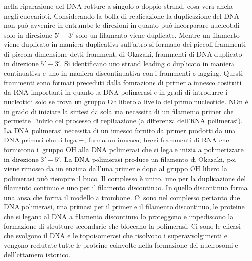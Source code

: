 nella riparazione del DNA rotture a singolo o doppio strand, cosa vera anche negli euocarioti. Considerando la bolla di replicazione la duplicazione del DNA non pu\`o avvenire in entrambe
le direzioni in quanto pu\`o incorporare nucleotidi solo in direzione $5'-3'$ solo un filamento viene duplicato. Mentre un filamento viene duplicato in maniera duplicativa sull'altro 
si formano dei piccoli frammenti di piccola dimensione detti frammenti di Okazaki, frammenti di DNA duplicato in direzione $5'-3'$. Si identificano uno strand leading o duplicato in 
maniera continuativa e uno in maniera discontinuativa con i frammenti o lagging. Questi frammenti sono formati preceduti dalla fomrazione di primer a innesco cosituiti da RNA importanti
in quanto la DNA polimerasi \`e in gradi di introdurre i nucleotidi solo se trova un gruppo Oh libero a livello del primo nucleotide. NOn \`e in grado di iniziare la sintesi da sola 
ma necessita di un filamento primer che permette l'inizio del processo di replicazione (a differenza dell'RNA polimerasi). La DNA polimerasi necessita di un innesco fornito da primer 
prodotti da una DNA primasi che si lega =, forma un innesco, brevi frammenti di RNA che forniscono il gruppo OH alla DNA polimerasi che si lega e inizia a polimerizzare in direzione 
$3'-5'$. La DNA polimerasi produce un filamento di Okazaki, poi viene rimosso da un enzima dall'una primer e dopo al gruppo OH libero la polimerasi pu\`o riempire il buco. Il complesso
\`e unico, uno per la duplicazione del filamento continuo e uno per il filamento discontinuo. In quello discontinuo forma una ansa che forma il modello a trombone. Ci sono nel complesso
pertanto due DNA polimerasi, una primasi per il primer e il filamento discontinuo, le proteine che si legano al DNA a filamento discontinuo lo proteggono e impediscono la formazione di
strutture secondarie che bloccano la polimerasi. Ci sono le elicasi che svolgono il DNA e le topoisomerasi che risolvono i superavvolgimenti e vengono reclutate tutte le proteine 
coinvolte nella formazione dei nucleosomi e dell'ottamero istonico. 


